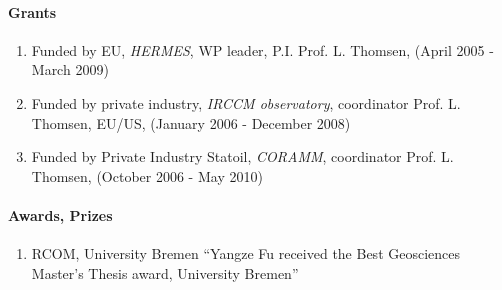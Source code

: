 \paragraph{Grants }

\begin{enumerate}

\item
Funded by EU, \emph{HERMES}, WP leader, P.I. Prof. L. Thomsen, (April 2005 -  March 2009) 

\item
Funded by private industry, \emph{IRCCM observatory}, coordinator Prof. L. Thomsen, EU/US,
(January 2006 - December 2008) 

\item
Funded by Private Industry Statoil, \emph{CORAMM}, coordinator Prof. L. Thomsen, (October
2006 - May 2010) 
\end{enumerate}



\paragraph{Awards, Prizes}
\begin{enumerate}
\item {RCOM, University Bremen} ``Yangze Fu received the Best Geosciences Master's Thesis award, University Bremen''
\end{enumerate}



\nocite{ceramicola2}
\nocite{praeg1}



